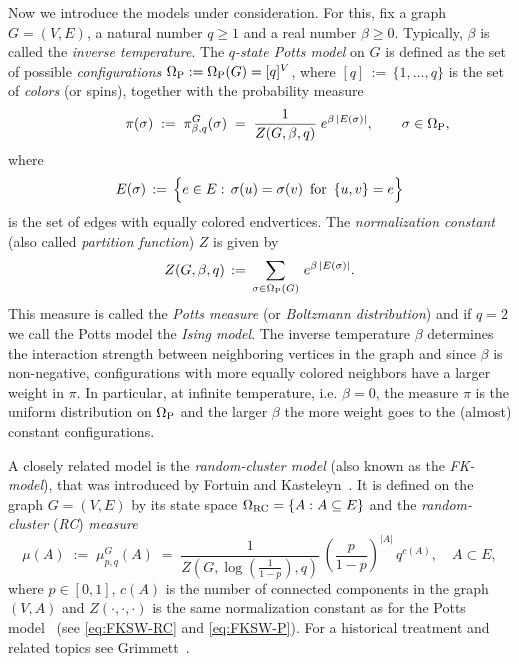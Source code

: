 \documentclass{dis}
\theoremstyle{citing}
\begin{document}
Now we introduce the models under consideration.
For this, fix a graph $G=(V,E)$, a natural number $q\ge1$ and 
a real number $\beta\ge0$. Typically, $\beta$ is called the 
\emph{inverse temperature}.
The \emph{$q$-state Potts model} on $G$ is 
defined as the set of possible \emph{configurations} 
${{\Omega}_{\rm P}}:={\Omega}_{\rm P}(G)=[q]^V$, where $[q]\,{:=}\,\{1,\dots,q\}$ 
is the set of \emph{colors} (or spins),
together with the probability measure
\vspace{1mm}
\begin{equation} \label{eq:Potts}
\qquad\qquad\pi(\sigma) \;:=\; \pi^{G}_{\beta,q}(\sigma) \;=\; 
	\frac1{Z(G,\beta,q)}\;	e^{\beta\,{\left\vert {E(\sigma)} \right\vert}},
	\qquad \sigma\in{\Omega}_{\rm P},
\end{equation}
where 
\vspace{3mm}
\begin{equation} \label{eq:Esigma}
E(\sigma) \,:=\, \Bigl\{e\in E:\, \sigma(u)=\sigma(v) 
		\,\text{ for }\, \{u,v\}=e\Bigr\}
\end{equation}
is the set of edges with equally colored endvertices. 
The {\it normalization constant} 
(also called {\it partition function}) $Z$ is given by
\[
Z(G,\beta,q) \,:=\, \sum_{\sigma\in{{\Omega}_{\rm P}}(G)}\, 
	e^{\beta\,{\left\vert {E(\sigma)} \right\vert}}. 
\] 
This measure is called the 
\emph{Potts measure} 
(or \emph{Boltzmann distribution}) and 
if $q=2$ we call the Potts model the 
\emph{Ising model}. 
The inverse temperature $\beta$ determines the 
interaction strength between neighboring vertices in the graph 
and since $\beta$ is non-negative, configurations with more 
equally colored neighbors have a larger weight in $\pi$. 
In particular, at infinite temperature, i.e. $\beta=0$, 
the measure $\pi$ is the uniform distribution on ${{\Omega}_{\rm P}}$ and the 
larger $\beta$ the more weight goes to the (almost) constant 
configurations.

A closely related model is the 
\emph{random-cluster model} 
(also known as the \emph{FK-model}), that was introduced by
Fortuin and Kasteleyn~\cite{FK}. 
It is defined on the graph $G=(V,E)$ by its state space 
${{\Omega}_{\rm RC}}=\{A: A\subseteq E\}$ and the 
\emph{random-cluster} ({\it RC}\/) \emph{measure}
\vspace{1mm}
\begin{equation} \label{eq:RC}
\mu(A) \;:=\; \mu^G_{p,q}(A) \;=\; 
\frac1{Z(G,\log(\frac1{1-p}),q)}\,
\left(\frac{p}{1-p}\right)^{{\left\vert {A} \right\vert}}\,q^{c(A)},\quad A\subset E,
\end{equation}
where $p\in[0,1]$, $c(A)$ is the number of connected components 
in the graph $(V,A)$
and $Z(\cdot,\cdot,\cdot)$ is the same normalization constant as 
for the Potts model~\cite[Thm.~1.10]{G1} (see 
\eqref{eq:FKSW-RC} and \eqref{eq:FKSW-P}). 
For a historical treatment and related topics see Grimmett~\cite{G1}.
\end{document}
